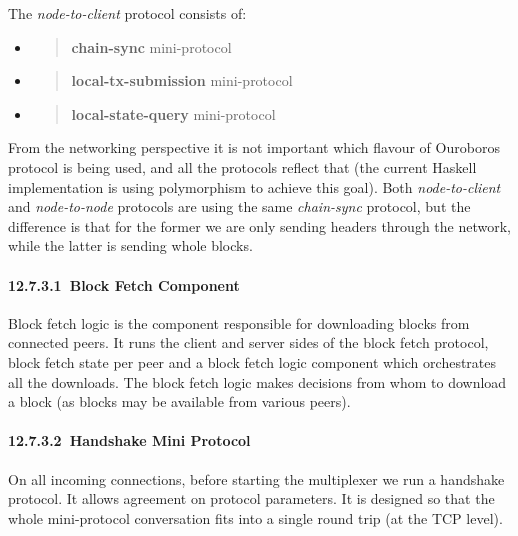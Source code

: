 \documentclass[11pt,a4paper]{article}
\begin{document}
The \emph{node-to-client} protocol consists of:

\begin{itemize}
\item
  \begin{quote}
  \textbf{chain-sync} mini-protocol
  \end{quote}
\item
  \begin{quote}
  \textbf{local-tx-submission} mini-protocol
  \end{quote}
\item
  \begin{quote}
  \textbf{local-state-query} mini-protocol
  \end{quote}
\end{itemize}

From the networking perspective it is not important which flavour of
Ouroboros protocol is being used, and all the protocols reflect that
(the current Haskell implementation is using polymorphism to achieve
this goal). Both \emph{node-to-client} and \emph{node-to-node} protocols
are using the same \emph{chain-sync} protocol, but the difference is
that for the former we are only sending headers through the network,
while the latter is sending whole blocks.

\hypertarget{block-fetch-component}{%
\paragraph{​12.7.3.1​~Block Fetch
Component}\label{block-fetch-component}}

Block fetch logic is the component responsible for downloading blocks
from connected peers. It runs the client and server sides of the block
fetch protocol, block fetch state per peer and a block fetch logic
component which orchestrates all the downloads. The block fetch logic
makes decisions from whom to download a block (as blocks may be
available from various peers).

\hypertarget{handshake-mini-protocol}{%
\paragraph{​12.7.3.2​~Handshake Mini
Protocol}\label{handshake-mini-protocol}}

On all incoming connections, before starting the multiplexer we run a
handshake protocol. It allows agreement on protocol parameters. It is
designed so that the whole mini-protocol conversation fits into a single
round trip (at the TCP level).
\end{document}
